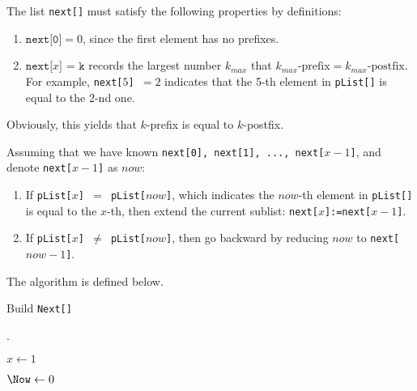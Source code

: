 


\def\HWTITLE{Homework 5}
\def\COURSECODE{CS 225: Data Structures}
\def\AUTHOR{Group D1}



\makeMyTitle
\thispagestyle{firstPage}

\begin{questions}

    The list \texttt{next[]} must satisfy the following properties by definitions:
    \begin{enumerate}
        \item $\texttt{next[0]} = 0$, since the first element has no prefixes.
        \item $\texttt{next[$x$] = k}$ records the largest number $k_{max}$ that $ k_{max}\mbox{-prefix} = k_{max}\mbox{-postfix}$. For example, \texttt{next[$5$] $= 2$} indicates that the 5-th element in \texttt{pList[]} is equal to the 2-nd one.
    \end{enumerate}

    Obviously, this yields that $k$-prefix is equal to $k$-postfix.

    Assuming that we have known \texttt{next[0], next[1], ..., next[$x-1$]}, and denote \texttt{next[$x-1$]} as $now$:

    \begin{enumerate}
        \item If \texttt{pList[$x$] $=$ pList[$now$]}, which indicates the $now$-th element in \texttt{pList[]} is equal to the $x$-th, then extend the current sublist: \texttt{next[$x$]:=next[$x-1$]}.

        \item If \texttt{pList[$x$] $\neq$ pList[$now$]}, then go backward by reducing $now$ to \texttt{next[$now-1$]}.
    \end{enumerate}

    The algorithm is defined below.

    \begin{algorithm}
        \caption{Build \texttt{Next[]}}
        \label{alg-build-next}

        \Next.

        $x \gets 1$

        $\Now \gets 0$


\end{algorithm}
\end{questions}
